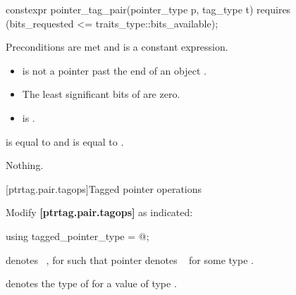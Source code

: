 \documentclass{wg21}
\providecommand{\constantwhen}{\Fundesc{Constant When}}
\newcommand{\editinstr}[1]{\textcolor{noteclr}{#1}}
\begin{document}
\begin{addedblock}

%
\begin{itemdecl}
constexpr pointer_tag_pair(pointer_type p, tag_type t)
  requires (bits_requested <= traits_type::bits_available);
\end{itemdecl}

\begin{itemdescr}
\pnum
\constantwhen
Preconditions are met and
 is a constant expression.

\pnum
\expects
\begin{itemize}
\item {} is not a pointer past the end of an object .
\item The  least significant bits of
 are zero.
\item {} is .
\end{itemize}

\pnum
\ensures
{} is equal to  and
 is equal to .

\pnum
\throws
Nothing.
\end{itemdescr}

\end{addedblock}

[ptrtag.pair.tagops]{Tagged pointer operations}

\editinstr{Modify \textbf{[ptrtag.pair.tagops]} as indicated:}

%
\begin{itemdecl}
using tagged_pointer_type = @\seebelow@;
\end{itemdecl}

\begin{itemdescr}
\begin{removedblock}
\pnum
{} denotes \cv{}~,
for \cv{} such that pointer denotes \cv{}~ for some type .
\end{removedblock}
\begin{addedblock}
\pnum
{} denotes the type of 
for a value  of type .
\end{addedblock}
\end{itemdescr}
\end{document}
